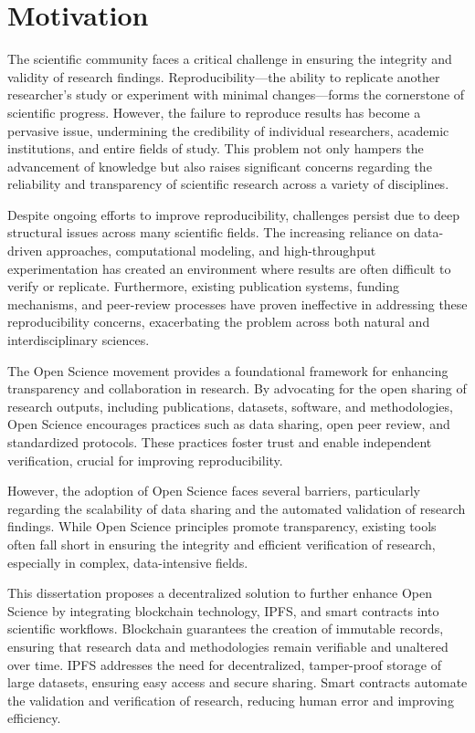 \documentclass{article}
\begin{document}
\section{Motivation}

The scientific community faces a critical challenge in ensuring the integrity and validity of research findings. Reproducibility—the ability to replicate another researcher's study or experiment with minimal changes—forms the cornerstone of scientific progress. However, the failure to reproduce results has become a pervasive issue, undermining the credibility of individual researchers, academic institutions, and entire fields of study. This problem not only hampers the advancement of knowledge but also raises significant concerns regarding the reliability and transparency of scientific research across a variety of disciplines.

Despite ongoing efforts to improve reproducibility, challenges persist due to deep structural issues across many scientific fields. The increasing reliance on data-driven approaches, computational modeling, and high-throughput experimentation has created an environment where results are often difficult to verify or replicate. Furthermore, existing publication systems, funding mechanisms, and peer-review processes have proven ineffective in addressing these reproducibility concerns, exacerbating the problem across both natural and interdisciplinary sciences.

The Open Science movement provides a foundational framework for enhancing transparency and collaboration in research. By advocating for the open sharing of research outputs, including publications, datasets, software, and methodologies, Open Science encourages practices such as data sharing, open peer review, and standardized protocols. These practices foster trust and enable independent verification, crucial for improving reproducibility.

However, the adoption of Open Science faces several barriers, particularly regarding the scalability of data sharing and the automated validation of research findings. While Open Science principles promote transparency, existing tools often fall short in ensuring the integrity and efficient verification of research, especially in complex, data-intensive fields.

This dissertation proposes a decentralized solution to further enhance Open Science by integrating blockchain technology, IPFS, and smart contracts into scientific workflows. Blockchain guarantees the creation of immutable records, ensuring that research data and methodologies remain verifiable and unaltered over time. IPFS addresses the need for decentralized, tamper-proof storage of large datasets, ensuring easy access and secure sharing. Smart contracts automate the validation and verification of research, reducing human error and improving efficiency.
\end{document}
